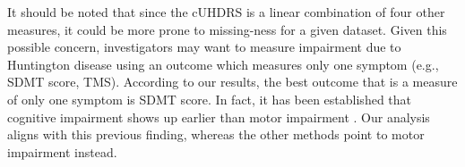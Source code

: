 \documentclass[12pt]{article}
\begin{document}

It should be noted that since the cUHDRS is a linear combination of four other measures, it could be more prone to missing-ness for a given dataset. Given this possible concern, investigators may want to measure impairment due to Huntington disease using an outcome which measures only one symptom (e.g., SDMT score, TMS). According to our results, the best outcome that is a measure of only one symptom is SDMT score. In fact, it has been established that cognitive impairment shows up earlier than motor impairment \citep{paulsen2008detection}. Our analysis aligns with this previous finding, whereas the other methods point to motor impairment instead.

\end{document}
